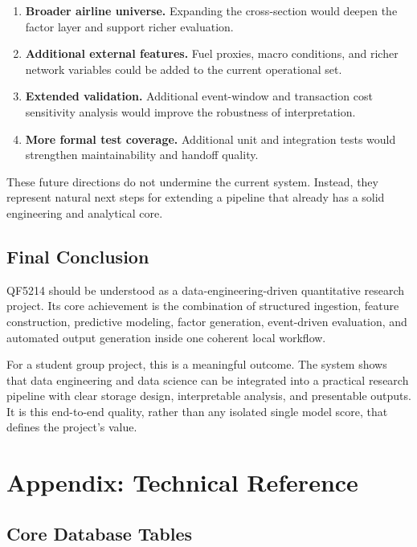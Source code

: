 \documentclass[11pt,a4paper]{article}
\begin{document}
\begin{enumerate}[leftmargin=*, label=\textbf{F\arabic*.}]
  \item \textbf{Broader airline universe.} Expanding the cross-section would
  deepen the factor layer and support richer evaluation.

  \item \textbf{Additional external features.} Fuel proxies, macro conditions,
  and richer network variables could be added to the current operational set.

  \item \textbf{Extended validation.} Additional event-window and transaction
  cost sensitivity analysis would improve the robustness of interpretation.

  \item \textbf{More formal test coverage.} Additional unit and integration
  tests would strengthen maintainability and handoff quality.
\end{enumerate}

These future directions do not undermine the current system. Instead, they
represent natural next steps for extending a pipeline that already has a solid
engineering and analytical core.

\subsection{Final Conclusion}

QF5214 should be understood as a data-engineering-driven quantitative research
project. Its core achievement is the combination of structured ingestion,
feature construction, predictive modeling, factor generation, event-driven
evaluation, and automated output generation inside one coherent local workflow.

For a student group project, this is a meaningful outcome. The system shows
that data engineering and data science can be integrated into a practical
research pipeline with clear storage design, interpretable analysis, and
presentable outputs. It is this end-to-end quality, rather than any isolated
single model score, that defines the project’s value.

\appendix

\section{Appendix: Technical Reference}

\subsection{Core Database Tables}
\end{document}
